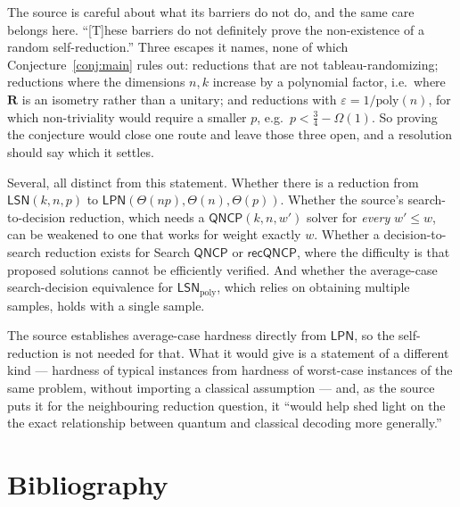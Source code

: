 \documentclass{aicr-conjecture}
\newcommand{\Om}{\Omega}
\newcommand{\eps}{\varepsilon}
\newcommand{\LSN}{\mathsf{LSN}}
\newcommand{\LPN}{\mathsf{LPN}}
\newcommand{\QNCP}{\mathsf{QNCP}}
\begin{document}
\begin{remark}\label{rem:scope}
The source is careful about what its barriers do not do, and the same
care belongs here. ``[T]hese barriers do not definitely prove the
non-existence of a random self-reduction.'' Three escapes it names, none
of which Conjecture~\ref{conj:main} rules out: reductions that are not
tableau-randomizing; reductions where the dimensions $n, k$ increase by a
polynomial factor, i.e.\ where $\mathbf{R}$ is an isometry rather than a
unitary; and reductions with $\eps = 1/\mathrm{poly}(n)$, for which
non-triviality would require a smaller $p$, e.g.\ $p < \frac{3}{4} -
\Om(1)$. So proving the conjecture would close one route and leave those
three open, and a resolution should say which it settles.
\end{remark}

\begin{remark}\label{rem:neighbours}
Several, all distinct from this statement. Whether there is a reduction
from $\LSN(k,n,p)$ to $\LPN(\Theta(np), \Theta(n), \Theta(p))$. Whether
the source's search-to-decision reduction, which needs a $\QNCP(k,n,w')$
solver for \emph{every} $w' \le w$, can be weakened to one that works for
weight exactly $w$. Whether a decision-to-search reduction exists for
Search $\QNCP$ or $\mathsf{recQNCP}$, where the difficulty is that
proposed solutions cannot be efficiently verified. And whether the
average-case search-decision equivalence for $\LSN_{\mathrm{poly}}$,
which relies on obtaining multiple samples, holds with a single sample.
\end{remark}

\begin{remark}\label{rem:why}
The source establishes average-case hardness directly from $\LPN$, so the
self-reduction is not needed for that. What it would give is a statement
of a different kind --- hardness of typical instances from hardness of
worst-case instances of the same problem, without importing a classical
assumption --- and, as the source puts it for the neighbouring reduction
question, it ``would help shed light on the the exact relationship between
quantum and classical decoding more generally.''
\end{remark}

\section{Bibliography}
\end{document}
